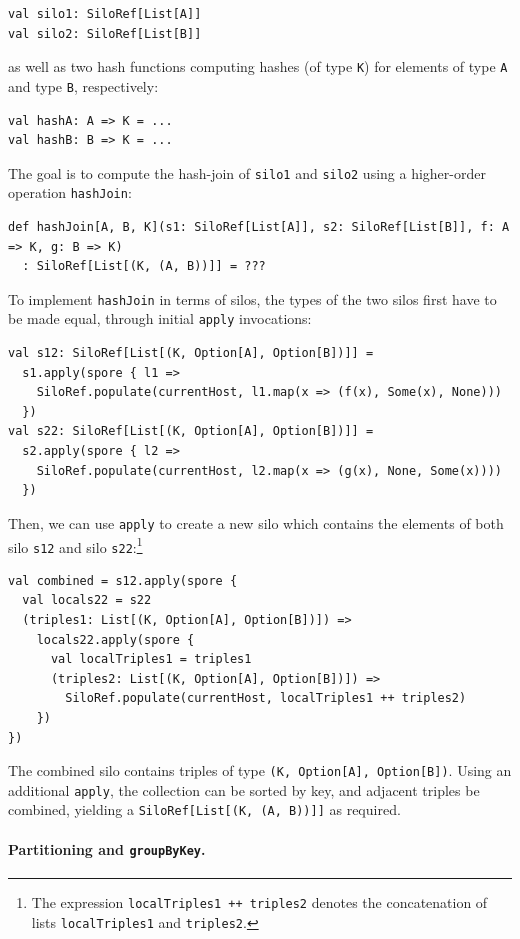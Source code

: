 \documentclass{jfp1}
\begin{document}
\begin{lstlisting}
val silo1: SiloRef[List[A]]
val silo2: SiloRef[List[B]]
\end{lstlisting}
\noindent
as well as two hash functions computing hashes (of type \verb|K|) for elements
of type \verb|A| and type \verb|B|, respectively:

\begin{lstlisting}
val hashA: A => K = ...
val hashB: B => K = ...
\end{lstlisting}
\noindent
The goal is to compute the hash-join of \verb|silo1| and \verb|silo2| using a
higher-order operation \verb|hashJoin|:

\begin{lstlisting}
def hashJoin[A, B, K](s1: SiloRef[List[A]], s2: SiloRef[List[B]], f: A => K, g: B => K)
  : SiloRef[List[(K, (A, B))]] = ???
\end{lstlisting}
\noindent
To implement \verb|hashJoin| in terms of silos, the types of the two silos first
have to be made equal, through initial \verb|apply| invocations:

\begin{lstlisting}
val s12: SiloRef[List[(K, Option[A], Option[B])]] =
  s1.apply(spore { l1 =>
    SiloRef.populate(currentHost, l1.map(x => (f(x), Some(x), None)))
  })
val s22: SiloRef[List[(K, Option[A], Option[B])]] =
  s2.apply(spore { l2 =>
    SiloRef.populate(currentHost, l2.map(x => (g(x), None, Some(x))))
  })
\end{lstlisting}
\noindent
Then, we can use \verb|apply| to create a new silo which contains the
elements of both silo \verb|s12| and silo \verb|s22|:\footnote{The
  expression \texttt{localTriples1 ++ triples2} denotes the
  concatenation of lists \texttt{localTriples1} and
  \texttt{triples2}.}

\begin{lstlisting}
val combined = s12.apply(spore {
  val locals22 = s22
  (triples1: List[(K, Option[A], Option[B])]) =>
    locals22.apply(spore {
      val localTriples1 = triples1
      (triples2: List[(K, Option[A], Option[B])]) =>
        SiloRef.populate(currentHost, localTriples1 ++ triples2)
    })
})
\end{lstlisting}
\noindent
The combined silo contains triples of type \verb|(K, Option[A], Option[B])|.
Using an additional \verb|apply|, the collection can be sorted by key, and
adjacent triples be combined, yielding a \texttt{SiloRef[List[(K, (A, B))]]} as
required.

\paragraph{Partitioning and \texttt{groupByKey}.}
\end{document}
